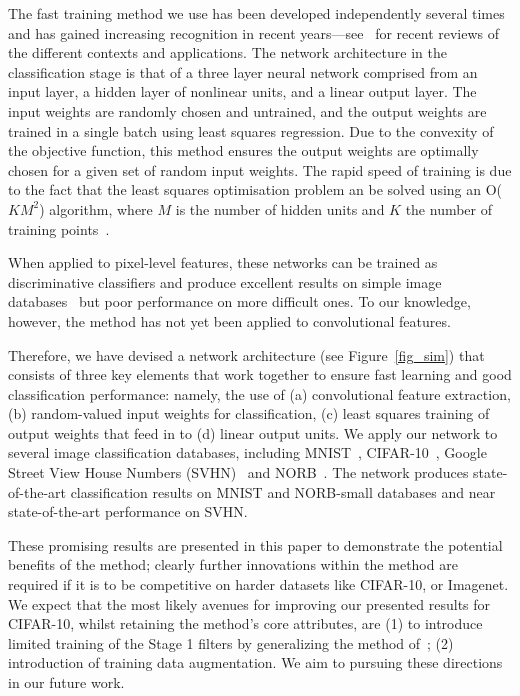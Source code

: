 \documentclass[conference]{IEEEtran}
\begin{document}
The fast training method  we use has been developed independently several times~\cite{Schmidt.92,Chen.96,Eliasmith,Huang.04} and has gained increasing recognition in recent years---see~\cite{Eliasmith.12,Stewart.14a,Huang.12,Huang.14} for recent reviews of the different contexts and applications. The network architecture  in the classification stage is that of a three layer neural network comprised from an input layer, a hidden layer of nonlinear units, and a linear output layer. The input weights are randomly chosen and untrained, and the output weights are trained in a single batch using least squares regression. Due to the convexity of the objective function, this method ensures the output weights are optimally chosen for a given set of random input weights. The rapid speed of training is due to the fact that the least squares optimisation problem an be solved using an O($KM^2$) algorithm, where $M$ is the number of hidden units and $K$ the number of training points~\cite{McDonnell.15PLOS}. 

When applied  to pixel-level features, these networks can be trained as discriminative classifiers and produce excellent results on simple image databases~\cite{vanSchaik.14,Tapson.14,Yu.12,Zhu.14,McDonnell.15PLOS,Zhu.15} but poor performance on more difficult ones.  To our knowledge, however, the method has not yet been applied to  convolutional features.

Therefore, we  have devised a network architecture (see Figure~\ref{fig_sim}) that consists of three key elements that work together to ensure fast learning and good classification performance: namely, the use of (a) convolutional feature extraction, (b) random-valued input weights for classification, (c) least squares training of output weights that feed in to (d) linear output units. We apply our network to several  image classification databases, including MNIST~\cite{MNIST}, CIFAR-10~\cite{Krizhevsky}, Google Street View House Numbers (SVHN)~\cite{SVHN} and NORB~\cite{LeCun.04}. The network produces state-of-the-art classification results on MNIST and NORB-small databases and near state-of-the-art performance on SVHN. 

These promising results are presented in this paper to demonstrate the potential benefits of the method; clearly further innovations within the method are required if it is to be competitive on harder datasets like CIFAR-10, or Imagenet. We expect that the most likely avenues for improving our presented results for CIFAR-10, whilst retaining the method's core attributes, are (1) to introduce limited training of the Stage 1 filters by generalizing the method of~\cite{Yu.12}; (2)  introduction of training data augmentation. We aim to pursuing these directions in our future work.
\end{document}
